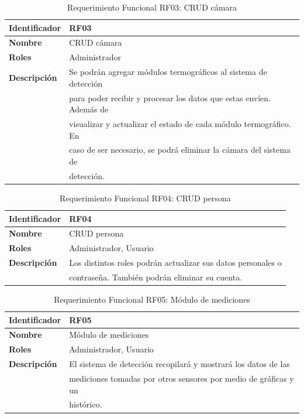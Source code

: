   \begin{table}[H]
	\centering
	\caption{Requerimiento Funcional RF03: CRUD cámara}
	\label{tab:rf03}
	\begin{tabular}{@{}ll@{}} 
	  \toprule
	  \textbf{Identificador} & RF03 \\
	  \midrule
	  \textbf{Nombre} & CRUD cámara \\
	  \textbf{Roles} & Administrador \\
	  \textbf{Descripción} & Se podrán agregar módulos termográficos al sistema de detección \\
						   & para poder recibir y procesar los datos que estas envíen. Además de \\
						   & visualizar y actualizar el estado de cada módulo termográfico. En \\
						   & caso de ser necesario, se podrá eliminar la cámara del sistema de \\
						   & detección. \\
	  \bottomrule
	\end{tabular}
  \end{table}
  
  \begin{table}[H]
	\centering
	\caption{Requerimiento Funcional RF04: CRUD persona}
	\label{tab:rf04}
	\begin{tabular}{@{}ll@{}} 
	  \toprule
	  \textbf{Identificador} & RF04 \\
	  \midrule
	  \textbf{Nombre} & CRUD persona \\
	  \textbf{Roles} & Administrador, Usuario \\
	  \textbf{Descripción} & Los distintos roles podrán actualizar sus datos personales o \\
						   & contraseña. También podrán eliminar su cuenta. \\
	  \bottomrule
	\end{tabular}
  \end{table}
  
  \begin{table}[H]
	\centering
	\caption{Requerimiento Funcional RF05: Módulo de mediciones}
	\label{tab:rf05}
	\begin{tabular}{@{}ll@{}} 
	  \toprule
	  \textbf{Identificador} & RF05 \\
	  \midrule
	  \textbf{Nombre} & Módulo de mediciones \\
	  \textbf{Roles} & Administrador, Usuario \\
	  \textbf{Descripción} & El sistema de detección recopilará y mostrará los datos de las \\
						   & mediciones tomadas por otros sensores por medio de gráficas y un \\
						   & histórico. \\
	  \bottomrule
	\end{tabular}
  \end{table}
  
